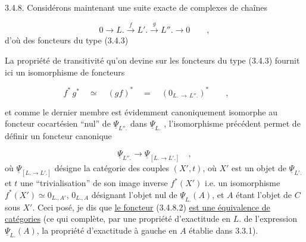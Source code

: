 3.4.8. Considérons maintenant une suite exacte de complexes de chaînes

\begin{equation}\tag{3.4.8.1}
0 \longrightarrow L. \xrightarrow{f} L'. \xrightarrow{g} L''. \longrightarrow 0 \qquad ,
\end{equation}
d'où des foncteurs du type (3.4.3)

\begin{center}
\end{center}
La propriété de transitivité qu'on devine sur les foncteurs du type (3.4.3) fournit ici un isomorphisme de foncteurs

\begin{equation*}
f^* \, g^* \quad \simeq \quad (gf)^* \quad = \quad (0_{L. \,\to\, L''.})^* \qquad , \qquad 
\end{equation*}


 et comme le dernier membre est évidemment canoniquement isomorphe au foncteur cocartésien ``nul'' de $\underline{\Psi}_{L''.}$ dans $\underline{\Psi}_{L.}$ , l'isomorphisme précédent permet de définir un foncteur canonique

\begin{equation}\tag{3.4.8.2}
\underline{\Psi}_{L''.} \longrightarrow \underline{\Psi}_{[L. \longrightarrow L'.]} \quad ,
\end{equation}
où $\underline{\Psi}_{[L. \longrightarrow L'.]}$ désigne la catégorie des couples $(X',t)$, où $X'$ est un objet de $\underline{\Psi}_{L'.}$ et $t$ une ``trivialisation'' de son image inverse $f^*(X')$ i.e. un isomorphisme $f^*(X') \simeq 0_{L.,A'}$, $0_{L.,A}$ désignant l'objet nul de $\underline{\Psi}_{L.}(A)$, et $A$ étant l'objet de $C$ sous $X'$. Ceci posé, je dis que \underline{le foncteur} (3.4.8.2) \underline{est une équivalence de catégories} (ce qui complète, par une propriété d'exactitude en $L.$ de l'expression $\underline{\Psi}_{L.}(A)$, la propriété d'exactitude à gauche en $A$ établie dans 3.3.1).

